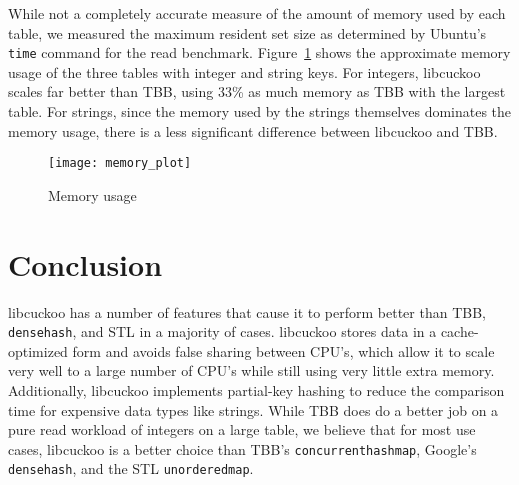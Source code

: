 \documentclass[12pt, letterpaper]{article}
\newcommand{\myfigwidth}{0.9\textwidth}
\newcommand{\tbbmap}{\texttt{concurrent\textunderscore hash\textunderscore map}}
\newcommand{\densehash}{\texttt{dense\textunderscore hash}}
\newcommand{\unorderedmap}{\texttt{unordered\textunderscore map}}
\begin{document}
While not a completely accurate measure of the amount of memory used by each
table, we measured the maximum resident set size as determined by Ubuntu's
\texttt{time} command for the read benchmark. Figure~\ref{fig:memory} shows the
approximate memory usage of the three tables with integer and string keys. For
integers, libcuckoo scales far better than TBB, using 33\% as much memory as TBB
with the largest table. For strings, since the memory used by the strings
themselves dominates the memory usage, there is a less significant difference
between libcuckoo and TBB.

\begin{figure}
  \centering
  \texttt{[image: memory\_plot]}
  \caption{Memory usage}
  \label{fig:memory}
\end{figure}

\section{Conclusion}
\label{sec:conclusion}

libcuckoo has a number of features that cause it to perform better than TBB,
{\densehash}, and STL in a majority of cases. libcuckoo stores data in a
cache-optimized form and avoids false sharing between CPU's, which allow it to
scale very well to a large number of CPU's while still using very little extra
memory. Additionally, libcuckoo implements partial-key hashing to reduce the
comparison time for expensive data types like strings. While TBB does do a
better job on a pure read workload of integers on a large table, we believe that
for most use cases, libcuckoo is a better choice than TBB's {\tbbmap}, Google's
{\densehash}, and the STL {\unorderedmap}.
\end{document}

